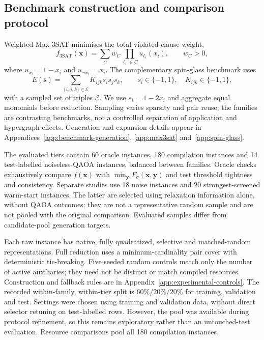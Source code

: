 \documentclass[a4paper,onecolumn,11pt,unpublished]{quantumarticle}
\theoremstyle{remark}
\begin{document}
\subsection{Benchmark construction and comparison protocol}
\label{sec:benchmark-protocol}

Weighted Max-3SAT minimises the total violated-clause weight,
\begin{equation}
 f_{\mathrm{3SAT}}(\bm x)=\sum_C w_C\prod_{\ell_i\in C}u_{\ell_i}(x_i),
 \qquad w_C>0,
 \label{eq:methods-max3sat}
\end{equation}
where $u_{x_i}=1-x_i$ and $u_{\neg x_i}=x_i$. The complementary spin-glass
benchmark uses
\begin{equation}
 E(\bm s)=\sum_{\{i,j,k\}\in\mathcal E}K_{ijk}s_is_js_k,
 \qquad s_i\in\{-1,1\},\quad K_{ijk}\in\{-1,1\},
 \label{eq:methods-cubic-spin}
\end{equation}
with a sampled set of triples $\mathcal E$. We use $s_i=1-2x_i$ and
aggregate equal monomials
before reduction. Sampling varies sparsity and pair reuse; the families are
contrasting benchmarks, not a controlled separation of application and
hypergraph effects. Generation and expansion details appear in
Appendices~\ref{app:benchmark-generation}, \ref{app:max3sat}
and~\ref{app:spin-glass}.

The evaluated tiers contain 60 oracle instances, 180 compilation instances
and 14 test-labelled noiseless-QAOA instances, balanced between families.
Oracle checks exhaustively compare $f(\bm x)$ with
$\min_{\bm y}F_\sigma(\bm x,\bm y)$ and test threshold tightness and consistency.
Separate studies use 18 noise instances and 20 strongest-screened warm-start
instances. The latter are selected using relaxation information alone, without
QAOA outcomes; they are not a representative random sample and are not pooled
with the original comparison. Evaluated samples differ from candidate-pool
generation targets.

Each raw instance has native, fully quadratized, selective and matched-random
representations. Full reduction uses a minimum-cardinality pair cover with
deterministic tie-breaking. Five seeded random controls match only the number
of active auxiliaries; they need not be distinct or match compiled resources.
Construction and fallback rules are in Appendix~\ref{app:experimental-controls}.
The recorded within-family, within-tier split is $60\%/20\%/20\%$ for
training, validation and test. Settings were chosen using training and
validation data, without direct selector retuning on test-labelled rows.
However, the pool was available during protocol refinement, so this remains
exploratory rather than an untouched-test evaluation. Resource comparisons
pool all 180 compilation instances.
\end{document}

